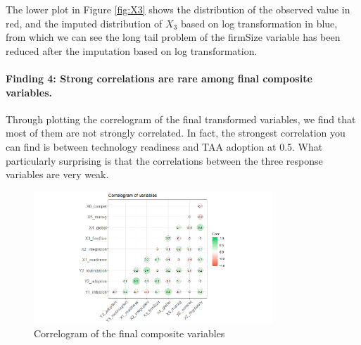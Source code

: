 \documentclass[12pt, letterpaper]{article}
\begin{document}
The lower plot in Figure \ref{fig:X3} shows the distribution of the observed value in red, and the imputed distribution of $X_3$ based on log transformation in blue, from which we can see the long tail problem of the firmSize variable has been reduced after the imputation based on log transformation.

\paragraph{Finding 4: Strong correlations are rare among final composite variables.} 
Through plotting the correlogram of the final transformed variables, we find that most of them are not strongly correlated. In fact, the strongest correlation you can find is between technology readiness and TAA adoption at 0.5. What particularly surprising is that the correlations between the three response variables are very weak.
\begin{figure}[H]
\centering
\includegraphics[width=0.8\textwidth]{correlogram}
\caption{Correlogram of the final composite variables}
\end{figure}
\end{document}

